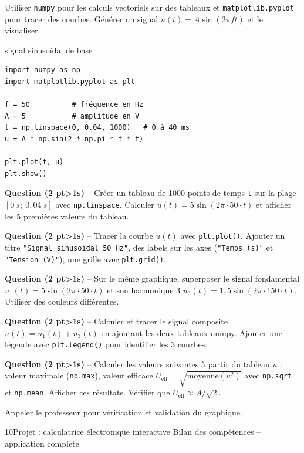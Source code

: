 \documentclass[11pt,a4paper]{article}
\newcommand{\cadreblanc}[1]{%
  \medskip\framebox[\linewidth][c]{\rule{0mm}{#1mm}}\par\medskip}
\newcounter{qnum}
\newcommand{\resetq}{\setcounter{qnum}{0}}
\newcommand{\q}[2]{%
  \stepcounter{qnum}%
  \noindent\textbf{Question \theqnum{} \normalfont(#2 pt\ifnum#2>1s\fi)} -- #1\par\smallskip}
\begin{document}
\begin{objectifbox}{}
  Utiliser \texttt{numpy} pour les calculs vectoriels sur des tableaux et \texttt{matplotlib.pyplot} pour tracer des courbes. Générer un signal $u(t) = A\sin(2\pi f t)$ et le visualiser.
\end{objectifbox}

\begin{codebox}{signal sinusoïdal de base}
\begin{lstlisting}
import numpy as np
import matplotlib.pyplot as plt

f = 50          # fréquence en Hz
A = 5           # amplitude en V
t = np.linspace(0, 0.04, 1000)   # 0 à 40 ms
u = A * np.sin(2 * np.pi * f * t)

plt.plot(t, u)
plt.show()
\end{lstlisting}
\end{codebox}

\q{Créer un tableau de 1000 points de temps \texttt{t} sur la plage $[0\ s;\ 0{,}04\ s]$ avec \texttt{np.linspace}. Calculer $u(t) = 5\sin(2\pi \cdot 50 \cdot t)$ et afficher les 5 premières valeurs du tableau.}{2}
\cadreblanc{20}

\q{Tracer la courbe $u(t)$ avec \texttt{plt.plot()}. Ajouter un titre \texttt{"Signal sinusoïdal 50 Hz"}, des labels sur les axes (\texttt{"Temps (s)"} et \texttt{"Tension (V)"}), une grille avec \texttt{plt.grid()}.}{2}
\cadreblanc{20}

\q{Sur le même graphique, superposer le signal fondamental $u_1(t) = 5\sin(2\pi \cdot 50 \cdot t)$ et son harmonique 3 $u_3(t) = 1{,}5\sin(2\pi \cdot 150 \cdot t)$. Utiliser des couleurs différentes.}{2}
\cadreblanc{20}

\q{Calculer et tracer le signal composite $u(t) = u_1(t) + u_3(t)$ en ajoutant les deux tableaux numpy. Ajouter une légende avec \texttt{plt.legend()} pour identifier les 3 courbes.}{2}
\cadreblanc{20}

\q{Calculer les valeurs suivantes à partir du tableau $u$ :
  valeur maximale (\texttt{np.max}), valeur efficace $U_{\text{eff}} = \sqrt{\text{moyenne}(u^2)}$ avec \texttt{np.sqrt} et \texttt{np.mean}.
  Afficher ces résultats. Vérifier que $U_{\text{eff}} \approx A/\sqrt{2}$.}{2}
\cadreblanc{22}

\begin{appelbox}
  \centering Appeler le professeur pour vérification et validation du graphique.
\end{appelbox}

\clearpage
\resetq
\begin{tptitre}{10}{Projet : calculatrice électronique interactive}
  Bilan des compétences -- application complète
\end{tptitre}
\end{document}
